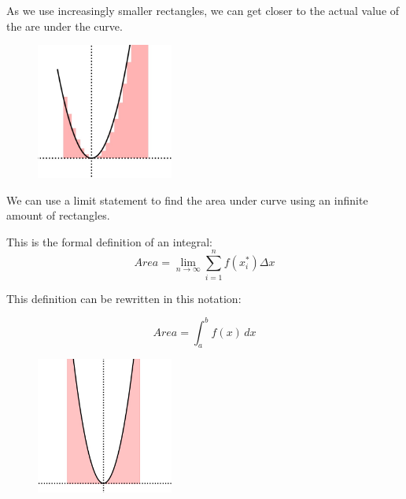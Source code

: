 \documentclass{article}
\begin{document}
\noindent
As we use increasingly smaller rectangles, we can get closer to the actual value of the are under the curve.

\vspace{1em}

\begin{figure}[H]
    \centering
    \includegraphics[width=0.4\textwidth]{integral2.jpeg}
    \label{fig:myplot}
\end{figure}

\vspace{1em}

\noindent
We can use a limit statement to find the area under curve using an infinite amount of rectangles. 

\noindent
\vspace{1em}

\noindent
This is the formal definition of an integral:
\begin{equation}
Area = \lim_{n \to \infty} \sum_{i=1}^{n} f(x_i^*) \Delta x
\end{equation}


\vspace{1em}

\noindent
This definition can be rewritten in this notation:

\begin{equation}
Area = \int_a^b f(x)\, dx 
\end{equation}

\vspace{1em}

\begin{figure}[H]
    \centering
    \includegraphics[width=0.4\textwidth]{integral3.jpeg}
    \label{fig:myplot}
\end{figure}
\end{document}
